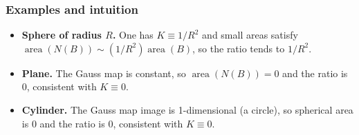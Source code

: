 \documentclass[12pt,a4paper]{article}
\theoremstyle{plain}
\theoremstyle{definition}      %
\begin{document}
	\subsubsection*{Examples and intuition}
	\begin{itemize}
		\item \textbf{Sphere of radius $R$.} One has $K\equiv 1/R^2$ and small areas satisfy
		$\operatorname{area}(N(B))\sim (1/R^2)\operatorname{area}(B)$, so the ratio tends to $1/R^2$.
		\item \textbf{Plane.} The Gauss map is constant, so $\operatorname{area}(N(B))=0$ and the ratio
		is $0$, consistent with $K\equiv 0$.
		\item \textbf{Cylinder.} The Gauss map image is 1-dimensional (a circle), so spherical area is
		$0$ and the ratio is $0$, consistent with $K\equiv 0$.
	\end{itemize}
	
	
\end{document}
